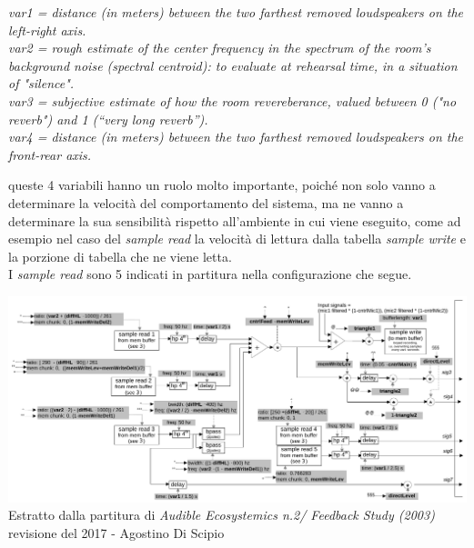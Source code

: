 \begin{center}
    \vspace{0.5cm}
    \textit{var1 = distance (in meters) between the two farthest removed loudspeakers on the left-right axis.} \\
    \textit{var2 = rough estimate of the center frequency in the spectrum of the room’s background noise (spectral centroid): to evaluate at rehearsal time, in a situation of "silence".} \\
    \textit{var3 = subjective estimate of how the room revereberance, valued between 0 ("no reverb") and 1 (“very long reverb”).} \\
    \textit{var4 = distance (in meters) between the two farthest removed loudspeakers on the front-rear axis.}
    \vspace{0.5cm}
\end{center}

queste 4 variabili hanno un ruolo molto importante, poiché non solo vanno a determinare la velocità del
comportamento del sistema, ma ne vanno a determinare la sua sensibilità rispetto all'ambiente in cui viene 
eseguito, come ad esempio nel caso del \textit{sample read} la velocità di lettura dalla tabella \textit{sample write} 
e la porzione di tabella che ne viene letta. \\
I \textit{sample read} sono 5 indicati in partitura nella configurazione che segue.

\begin{center}
\includegraphics[width=14cm]{figures/SAMPLERSFeedbackstudy2017.pdf} \\
{Estratto dalla partitura di \textit{Audible Ecosystemics n.2/ Feedback Study (2003)} \\
revisione del 2017 - Agostino Di Scipio} \\ 
\vspace{0.5cm}
\end{center}

